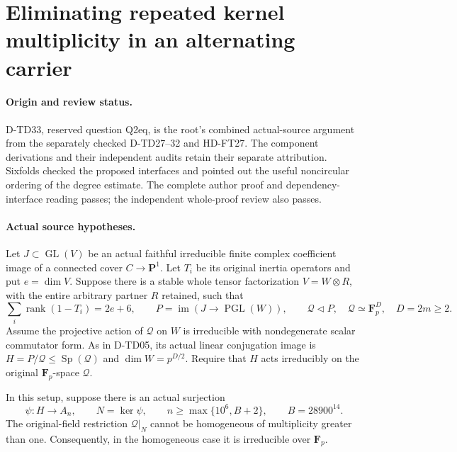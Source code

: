 \section{Eliminating repeated kernel multiplicity in an alternating carrier}
\label{sec:heisenberg-repeated-kernel-exclusion}

\paragraph{Origin and review status.}
D-TD33, reserved question Q2eq, is the root's combined actual-source
argument from the separately checked D-TD27--32 and HD-FT27.
The component derivations and their independent audits retain their
separate attribution. Sixfolds checked the proposed interfaces and
pointed out the useful noncircular ordering of the degree estimate.
The complete author proof and dependency-interface reading passes;
the independent whole-proof review also passes.

\paragraph{Actual source hypotheses.}
Let $J\subset\operatorname{GL}(V)$ be an actual faithful irreducible
finite complex coefficient image of a connected cover $C\to\mathbf P^1$.
Let $T_i$ be its original inertia operators and put $e=\dim V$.
Suppose there is a stable whole tensor factorization $V=W\otimes R$,
with the entire arbitrary partner $R$ retained, such that
\[
 \sum_i\operatorname{rank}(1-T_i)=2e+6,\qquad
 P=\operatorname{im}(J\to\operatorname{PGL}(W)),\qquad
 \mathcal Q\triangleleft P,\quad
 \mathcal Q\simeq\mathbf F_p^{D},\quad D=2m\ge2.
 \tag{TDR.1}
\]
Assume the projective action of $\mathcal Q$ on $W$ is irreducible
with nondegenerate scalar commutator form. As in D-TD05, its actual
linear conjugation image is
$H=P/\mathcal Q\le\operatorname{Sp}(\mathcal Q)$ and
$\dim W=p^{D/2}$. Require that $H$ acts irreducibly on the original
$\mathbf F_p$-space $\mathcal Q$.

\begin{theorem}[D-TD33]
In this setup, suppose there is an actual surjection
\[
 \psi:H\longrightarrow A_n,\qquad N=\ker\psi,\qquad
 n\ge\max\{10^6,B+2\},\qquad B=28900^{14}.
 \tag{TDR.2}
\]
The original-field restriction $\mathcal Q|_N$ cannot be homogeneous
of multiplicity greater than one. Consequently, in the homogeneous
case it is irreducible over $\mathbf F_p$.
\end{theorem}

